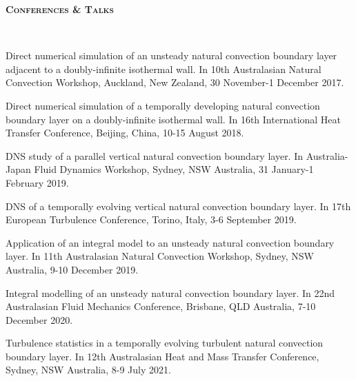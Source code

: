 \documentclass[letterpaper, 10pt]{article}
\newenvironment{changemargin}[2]{%
  \begin{list}{}{%
      \setlength{\topsep}{0pt}%
      \setlength{\leftmargin}{#1}%
      \setlength{\rightmargin}{#2}%
      \setlength{\listparindent}{\parindent}%
      \setlength{\itemindent}{\parindent}%
      \setlength{\parsep}{\parskip}%
    }%
  \item[]}{\end{list}
}
\newcommand{\lineover}{
  \begin{changemargin}{-0.05in}{-0.05in}
    \vspace*{-8pt}
    \hrulefill \\
    \vspace*{-2pt}
  \end{changemargin}
}
\newcommand{\header}[1]{
  \begin{changemargin}{-0.5in}{-0.5in}
    \textbf{\scshape{#1}}\\
    \lineover
  \end{changemargin}
}
\newenvironment{body} {
  \vspace*{-16pt}
  \begin{changemargin}{-0.25in}{-0.5in}
  }
  {\end{changemargin}
}
\begin{document}
\header{Conferences \& Talks}
\begin{body}
  \vspace{14pt}

  Direct numerical simulation of an unsteady natural convection boundary layer adjacent to a doubly-infinite isothermal wall. In 10th Australasian Natural Convection Workshop, Auckland, New Zealand, 30 November-1 December 2017.

  \smallskip

  Direct numerical simulation of a temporally developing natural convection boundary layer on a doubly-infinite isothermal wall. In 16th International Heat Transfer Conference, Beijing, China, 10-15 August 2018. 
  
  \smallskip
  
  DNS study of a parallel vertical natural convection boundary layer. In Australia-Japan Fluid Dynamics Workshop, Sydney, NSW Australia, 31 January-1 February 2019.
  
  \smallskip
  
  DNS of a temporally evolving vertical natural convection boundary layer. In 17th European Turbulence Conference, Torino, Italy, 3-6 September 2019.
  
  \smallskip
  
  Application of an integral model to an unsteady natural convection boundary layer. In 11th Australasian Natural Convection Workshop, Sydney, NSW Australia, 9-10 December 2019.
  
  \smallskip
  
  Integral modelling of an unsteady natural convection boundary layer. In 22nd Australasian Fluid Mechanics Conference, Brisbane, QLD Australia, 7-10 December 2020.
  \smallskip

  Turbulence statistics in a temporally evolving turbulent natural convection boundary layer. In 12th Australasian Heat and Mass Transfer Conference, Sydney, NSW Australia, 8-9 July 2021.
\end{body}
\smallskip
\end{document}
